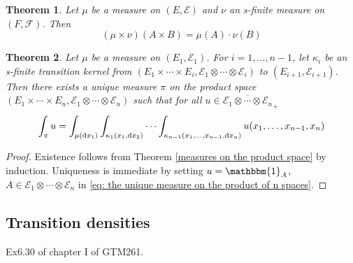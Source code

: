\documentclass[11pt, a4paper, openany]{book}
\newtheorem{thm}{Theorem}\newtheorem{lem}{Lemma}\newtheorem{crl}{Corollary}
\theoremstyle{definition}
\begin{document}
    \begin{thm}
        Let $\mu$ be a measure on $(E,\mathscr{E})$ and $\nu$ an s-finite measure on $(F,\mathscr{F})$. Then
        \[
            (\mu\times\nu)(A\times B)=\mu(A)\cdot \nu(B)
        \]
    \end{thm}
    \begin{thm}\label{the unique measure on the product of n spaces}
        Let $\mu$ be a measure on $(E_1,\mathscr{E}_1)$. For $i=1,\dots,n-1$, let $\kappa_i$ be
        an s-finite transition kernel from $(E_1\times\cdots\times E_i,\mathscr{E}_1\otimes\cdots\otimes\mathscr{E}_i)$ to $(E_{i+1},\mathscr{E}_{i+1})$. Then there exists a unique measure $\pi$ on the product space
        $(E_1\times\cdots\times E_n,\mathscr{E}_1\otimes\cdots\otimes \mathscr{E}_n)$ such that for all $u\in\overline{\mathscr{E}_1\otimes\cdots\otimes \mathscr{E}_n}_+$
        \begin{equation}\label{eq: the unique measure on the product of n spaces}
            \int_{\pi} u
            =\int_{\mu(\odif{x_1})}\int_{\kappa_1(x_1,\odif{x_2})}\cdots \int_{\kappa_{n-1}(x_1,\dots,x_{n-1},\odif{x_n})}u(x_1,\dots,x_{n-1},x_n)
        \end{equation}
    \end{thm}
    \begin{proof}
        Existence follows from Theorem \ref{measures on the product space} by induction. Uniqueness is immediate by setting $u=\mathbbm{1}_A$, $A\in \mathscr{E}_1\otimes\cdots\otimes \mathscr{E}_n$ in \eqref{eq: the unique measure on the product of n spaces}.
    \end{proof}
\subsection{Transition densities}
    Ex6.30 of chapter I of GTM261.
\end{document}
